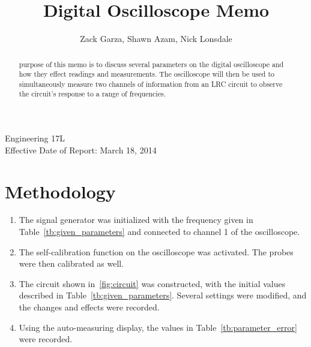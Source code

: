 \documentclass[twocolumn,english]{IEEEtran}
\theoremstyle{plain}
\theoremstyle{plain}
\begin{document}
\title{Digital Oscilloscope Memo}


\author{Zack Garza, Shawn Azam, Nick Lonsdale}


\IEEEspecialpapernotice
{Engineering 17L\\
Effective Date of Report: March 18, 2014}


\maketitle
\begin{abstract}
 purpose of this memo is to discuss several parameters on the digital oscilloscope and how they effect readings and measurements. The oscilloscope will then be used to simultaneously measure two channels of information from an LRC circuit to observe the circuit's response to a range of frequencies.
\end{abstract}

\tableofcontents

\section{Methodology}
\begin{enumerate}
 \item The signal generator was initialized with the frequency given in Table~\ref{tb:given_parameters} and connected to channel 1 of the oscilloscope.
 \item The self-calibration function on the oscilloscope was activated. The probes were then calibrated as well.
 \item The circuit shown in~\ref{fig:circuit} was constructed, with the initial values described in Table~\ref{tb:given_parameters}. Several settings were modified, and the changes and effects were recorded.
 \item Using the auto-measuring display, the values in Table~\ref{tb:parameter_error} were recorded.
\end{enumerate}
\end{document}
